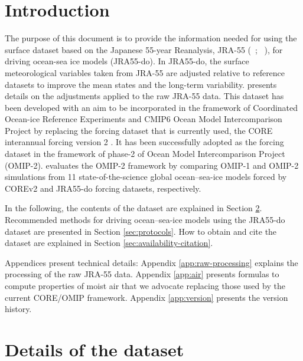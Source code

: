 \documentclass[dvipdfmx]{elsarticle_mod}
\begin{document}
\tableofcontents

\section{Introduction}

The purpose of this document is to provide the information needed for using the surface dataset based on the Japanese 55-year Reanalysis, JRA-55 (\citeauthor{Kobayashi_et_al_2015}~\citeyear{Kobayashi_et_al_2015}; \citeauthor{Harada_et_al_2016}~\citeyear{Harada_et_al_2016}), for driving ocean-sea ice models (JRA55-do). In JRA55-do, the surface meteorological variables taken from JRA-55 are adjusted relative to reference datasets to improve the mean states and the long-term variability. \citet{Tsujino_et_al_2018} presents details on the adjustments applied to the raw JRA-55 data. This dataset has been developed with an aim to be incorporated in the framework of Coordinated Ocean-ice Reference Experiments \citep[COREs;][]{Griffies_et_al_2012} and CMIP6 Ocean Model Intercomparison Project \citep[OMIP;][]{Griffies_et_al_2016} by replacing the forcing dataset that is currently used, the CORE interannual forcing version 2 \citep[COREv2;][]{Large_and_Yeager_2009}. It has been successfully adopted as the forcing dataset in the framework of phase-2 of Ocean Model Intercomparison Project (OMIP-2). \citet{Tsujino_et_al_2020} evaluates the OMIP-2 framework by comparing OMIP-1 and OMIP-2 simulations from 11 state-of-the-science global ocean--sea-ice models forced by COREv2 and JRA55-do forcing datasets, respectively.

In the following, the contents of the dataset are explained in Section \ref{sec:dataset-details}. Recommended methods for driving ocean--sea-ice models using the JRA55-do dataset are presented in Section \ref{sec:protocols}. How to obtain and cite the dataset are explained in Section \ref{sec:availability-citation}.

Appendices present technical details: Appendix \ref{app:raw-processing} explains the processing of the raw JRA-55 data. Appendix \ref{app:air} presents formulas to compute properties of moist air that we advocate replacing those used by the current CORE/OMIP framework. Appendix \ref{app:version} presents the version history.


\section{Details of the dataset}
\label{sec:dataset-details}
\end{document}
